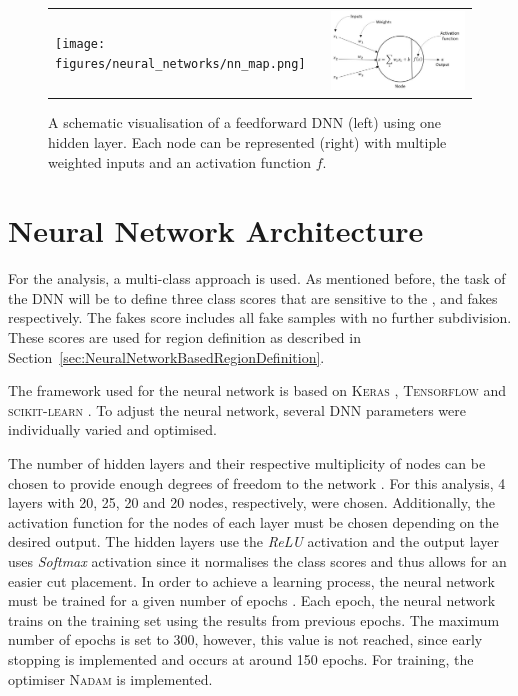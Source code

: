 \documentclass[bachelor,oneside, BCOR10mm,
			ngerman,english  %
]{GAUBM}
\begin{document}
\begin{figure}[t]
	\centering
	\begin{tabular}{m{} m{}}
			\texttt{[image: figures/neural\_networks/nn\_map.png]} &
			\includegraphics[width=.47\textwidth]{figures/neural_networks/nn_node.png}
	\end{tabular}
	\caption{A schematic visualisation of a feedforward DNN (left) using one hidden layer. Each node can be represented (right) with multiple weighted inputs and an activation function $f$.}  
	\label{fig:NeuralNetwork}
\end{figure}


\section{Neural Network Architecture}
\label{sec:NeuralNetworkArchitecture}
For the analysis, a multi-class approach is used. As mentioned before, the task of the DNN will be to define three class scores that are sensitive to the \ttbarZ, \ttbarW and fakes respectively. The fakes score includes all fake samples with no further subdivision. These scores are used for region definition as described in Section~\ref{sec:NeuralNetworkBasedRegionDefinition}.

The framework used for the neural network is based on \textsc{Keras} \cite{nn_keras}, \textsc{Tensorflow} \cite{nn_tensorflow} and \textsc{scikit-learn} \cite{nn_scikit-learn}. To adjust the neural network, several DNN parameters were individually varied and optimised.

The number of hidden layers and their respective multiplicity of nodes can be chosen to provide enough degrees of freedom to the network \cite{nn_parameters}. For this analysis, 4 layers with 20, 25, 20 and 20 nodes, respectively, were chosen. Additionally, the activation function for the nodes of each layer \cite{nn_activationfunction} must be chosen depending on the desired output. The hidden layers use the \textit{ReLU} activation and the output layer uses \textit{Softmax} activation since it normalises the class scores and thus allows for an easier cut placement. In order to achieve a learning process, the neural network must be trained for a given number of epochs \cite{nn_parameters}. Each epoch, the neural network trains on the training set using the results from previous epochs. The maximum number of epochs is set to 300, however, this value is not reached, since early stopping is implemented and occurs at around 150 epochs. For training, the optimiser \textsc{Nadam} \cite{nn_nadamoptimiser} is implemented. 
\end{document}
